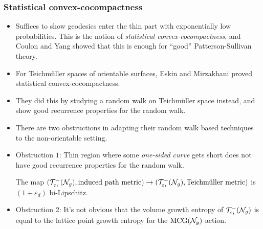 \begin{frame}
\begin{columns}
\end{columns}
\end{frame}

\begin{frame}
  \frametitle{Statistical convex-cocompactness}
  \begin{itemize}
  \item<2-> Suffices to show geodesics enter the thin part with exponentially low probabilities. This is the notion of \emph{statistical convex-cocompactness}, and Coulon and Yang showed that this is enough for ``good'' Patterson-Sullivan theory.
  \item<3-> For Teichmüller spaces of orientable surfaces, Eskin and Mirzakhani proved statistical convex-cocompactness.
  \item<4-> They did this by studying a random walk on Teichmüller space instead, and show good recurrence properties for the random walk.
  \item<5-> There are two obstructions in adapting their random walk based techniques to the non-orientable setting.
  \item<6-> Obstruction $1$: Thin region where some \emph{one-sided curve} gets short does not have good recurrence properties for the random walk.
     {
      \begin{theorem}[K.]
        The map $(\mathcal{T}_{\varepsilon_t}^{-}(\mathcal{N}_g), \text{induced path metric}) \to (\mathcal{T}_{\varepsilon_t}^{-}(\mathcal{N}_g), \text{Teichmüller metric})$ is $(1 + \varepsilon_d)$ bi-Lipschitz.
      \end{theorem}
    }
  \item<8-> Obstruction 2: It's not obvious that the volume growth entropy of $\mathcal{T}_{\varepsilon_t}^{-}(\mathcal{N}_g)$ is equal to the lattice point growth entropy for the $\text{MCG}(\mathcal{N}_g)$ action.
  \end{itemize}
\end{frame}

